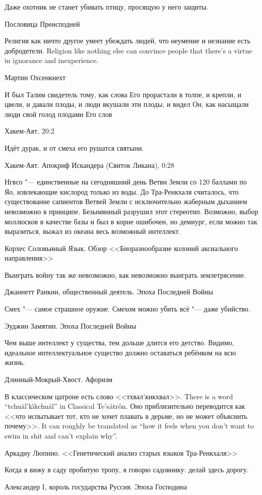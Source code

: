 \epigraph
{Даже охотник не станет убивать птицу, просящую у него защиты.}
{Пословица Преисподней}

\epigraph{
{Религия как ничто другое умеет убеждать людей, что неумение и незнание есть добродетели.}
{Religion like nothing else can convince people that there's a virtue in ignorance and inexperience.}
}{
Мартин Охсенкнехт
}

\epigraph
{\ldotst И был Талим свидетель тому, как слова Его прорастали в толпе, и крепли, и цвели, и давали плоды, и люди вкушали эти плоды, и видел Он, как насыщали люди свой голод плодами Его слов\ldotst}
{Хакем-Аят, 20:2}

\epigraph
{Идёт дурак, и от смеха его рушатся святыни.}
{Хакем-Аят. Апокриф Искандера (Свиток Ликана), 0:28}

\epigraph
{Нгвсо "--- единственные на сегодняшний день Ветви Земли со 120 баллами по Яо, извлекающие кислород только из воды.
До Тра-Ренкхаля считалось, что существование сапиентов Ветвей Земли с исключительно жаберным дыханием невозможно в принципе.
Безымянный разрушил этот стереотип.
Возможно, выбор моллюсков в качестве базы и был в корне ошибочен, но демиург, если можно так выразиться, выжал из океана весь возможный интеллект.}
{Корхес Соловьиный Язык.
Обзор <<Биоразнообразие колоний аксиального направления>>}

\epigraph
{Выиграть войну так же невозможно, как невозможно выиграть землетрясение.}
{Джаннетт Ранкин, общественный деятель.
Эпоха Последней Войны}

\epigraph
{Смех "--- самое страшное оружие.
Смехом можно убить всё "--- даже убийство.}
{Эуджин Замятин.
Эпоха Последней Войны}

\epigraph
{Чем выше интеллект у существа, тем дольше длится его детство.
Видимо, идеальное интеллектуальное существо должно оставаться ребёнком на всю жизнь.}
{Длинный-Мокрый-Хвост.
Афоризм}

\epigraph{
{В классическом цатроне есть слово <<тхвал'кикхвал>>.}
{There is a word ``tchu\={a}l'k\'{\i}kchu\r{a}l'' in Classical Te's\'{a}tr\v{o}n.}
{Оно приблизительно переводится как <<что испытывает тот, кто не хочет плавать в дерьме, но не может объяснить почему>>.}
{It can roughly be translated as ``how it feels when you don't want to swim in shit and can't explain why''.}
}{
Аркадиу Люпино.
<<Генетический анализ старых языков Тра-Ренкхаля>>
}

\epigraph
{Когда я вижу в саду пробитую тропу, я говорю садовнику: делай здесь дорогу.}
{Александер I, король государства Руссия.
Эпоха Господина}

